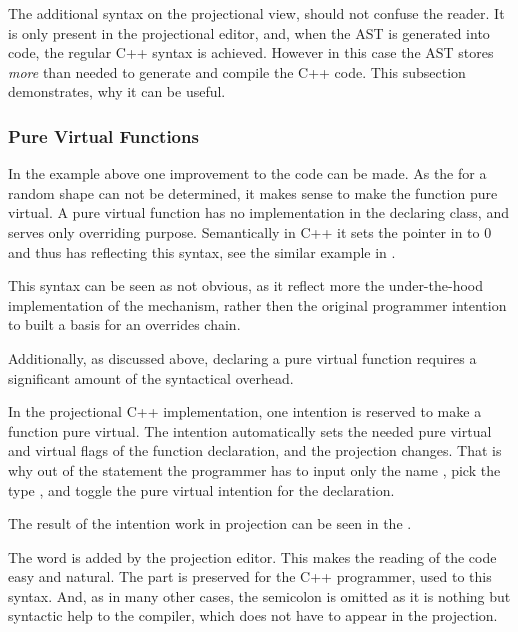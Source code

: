
The additional syntax on the projectional view, should not confuse the reader. It is only 
present in the projectional editor, and, when the AST is generated into code, the regular
C++ syntax is achieved. However in this case the AST stores \emph{more} than needed to 
generate and compile the C++ code. This subsection demonstrates, why it can be useful.



\subsubsection{Pure Virtual Functions}

In the example above one improvement to the code can be made. As the  for a random shape can not 
be determined, it makes sense to make the  function pure virtual. A pure virtual function has no 
implementation in the declaring class, and serves only overriding purpose. Semantically in C++ it sets the 
pointer in  to 0 and thus has reflecting this syntax, see the similar example in .

This syntax can be seen as not obvious, as it reflect more the under-the-hood implementation of the mechanism,
rather then the original programmer intention to built a basis for an overrides chain. 

Additionally, as discussed above, declaring a pure virtual function requires a significant amount of the syntactical
overhead.

In the projectional C++ implementation, one intention is reserved to make a function pure virtual. The intention automatically
sets the needed pure virtual and virtual flags of the function declaration, and the projection changes. That is why out of the 
statement  the programmer has to input only the name , pick the type , and
toggle the pure virtual intention for the declaration. 

The result of the intention work in projection can be seen in the .


The word  is added by the projection editor. This makes the reading of the code easy and natural.
The  part is preserved for the C++ programmer, used to this syntax. And, as in many other cases, 
the semicolon is omitted as it is nothing but syntactic help to the compiler, which does not have to appear 
in the projection.

